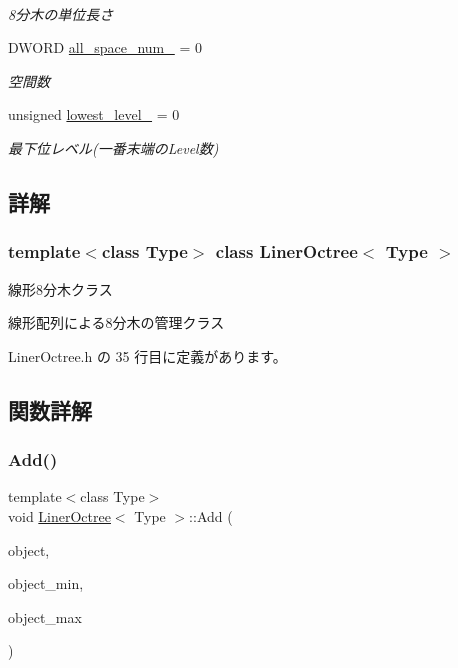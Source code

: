 \begin{DoxyCompactItemize}
$$\begin{DoxyCompactList}\small\item\em 8分木の単位長さ \end{DoxyCompactList}\item 
D\+W\+O\+RD \mbox{\hyperlink{class_liner_octree_aff1d6fcdf606bb2e42461714c0e7aa50}{all\+\_\+space\+\_\+num\+\_\+}} = 0
\begin{DoxyCompactList}\small\item\em 空間数 \end{DoxyCompactList}\item 
unsigned \mbox{\hyperlink{class_liner_octree_aa62a6ad34ceed4a8fef93123ca45350d}{lowest\+\_\+level\+\_\+}} = 0
\begin{DoxyCompactList}\small\item\em 最下位レベル(一番末端の\+Level数) \end{DoxyCompactList}\end{DoxyCompactItemize}


\subsection{詳解}
\subsubsection*{template$<$class Type$>$\newline
class Liner\+Octree$<$ Type $>$}

線形8分木クラス 

線形配列による8分木の管理クラス 

 Liner\+Octree.\+h の 35 行目に定義があります。



\subsection{関数詳解}
\mbox{\label{class_liner_octree_ac5773a5193942a68f77a33baed9d69d4}} 
\subsubsection{\texorpdfstring{Add()}{Add()}}
{\footnotesize\ttfamily template$<$class Type$>$ \\
void \mbox{\hyperlink{class_liner_octree}{Liner\+Octree}}$<$ Type $>$\+::Add (\begin{DoxyParamCaption}\item[{\mbox{\hyperlink{class_object_of_tree}{Object\+Of\+Tree}}$<$ Type $>$ $\ast$}]{object,  }\item[{const \mbox{\hyperlink{_vector3_d_8h_ab16f59e4393f29a01ec8b9bbbabbe65d}{Vec3}} $\ast$}]{object\+\_\+min,  }\item[{const \mbox{\hyperlink{_vector3_d_8h_ab16f59e4393f29a01ec8b9bbbabbe65d}{Vec3}} $\ast$}]{object\+\_\+max }\end{DoxyParamCaption})\hspace{0.3cm}{\ttfamily [inline]}}



